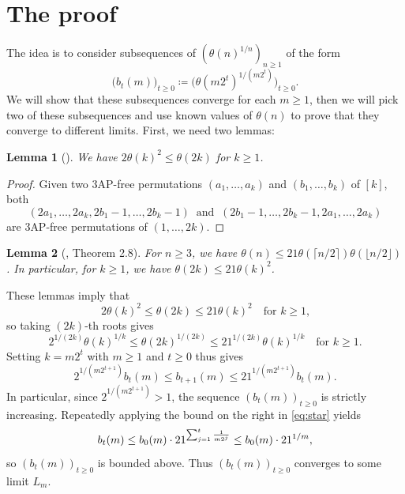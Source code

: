 \documentclass[twoside, reqno]{amsart} %
\newtheorem{lemma}{Lemma}
\begin{document}
\section{The proof}
The idea is to consider subsequences of $(\theta(n)^{1/n})_{n\ge1}$
of the form 
\begin{equation}
\bigl(b_t(m)\bigr)_{t\ge0}\coloneqq\bigl(\theta(m2^t)^{1/(m2^t)}\bigr)_{t\ge0}.
\end{equation}
We will show that these subsequences converge for each $m\ge1$, 
then we will pick two of these subsequences and use known values of $\theta(n)$
to prove that they converge to different limits. First, we need two lemmas:

\begin{lemma}[\cite{DEGS77}]
We have $2\theta(k)^2\le\theta(2k)$ for $k\ge1$.
\end{lemma}

\begin{proof}
Given two $3$AP-free permutations $(a_1,\dots, a_k)$ and 
$(b_1,\dots,b_k)$ of $[k]$,
both $$(2a_1,\dots,2a_k,2b_1-1,\dots,2b_k-1)
\;\;\text{and}\;\; 
(2b_1-1, \dots, 2b_k-1, 2a_1, \dots, 2a_k)$$
are $3$AP-free permutations of $(1,\dots,2k)$.
\end{proof}

\begin{lemma}[\cite{Sha09}, Theorem 2.8] \label{lemma:2}
For $n\ge3$, we have $\theta(n)\le21\theta(\lceil n/2\rceil)\theta(\lfloor n/2\rfloor)$. 
In particular, for $k\ge1$, we have $\theta(2k)\le21\theta(k)^2$.
\end{lemma}
These lemmas imply that
\begin{equation}
2\theta(k)^2\le\theta(2k)\le21\theta(k)^2
\quad\text{for $k\ge1$,}
\end{equation}
so taking $(2k)$-th roots gives
\begin{equation}
2^{1/(2k)}\theta(k)^{1/k}
\le\theta(2k)^{1/(2k)}
\le21^{1/(2k)}\theta(k)^{1/k}
\quad\text{for $k\ge1$.}
\end{equation}
Setting $k=m2^t$ with $m\ge1$ and $t\ge0$ thus gives
\begin{equation} \label{eq:star}
2^{1/(m2^{t+1})}b_t(m)\le b_{t+1}(m)\le21^{1/(m2^{t+1})}b_t(m).
\end{equation}
In particular, since $2^{1/(m2^{t+1})}>1$, the sequence $(b_t(m))_{t\ge0}$
is strictly increasing. 
Repeatedly applying the bound on the right in \eqref{eq:star} yields
\begin{equation}
b_t(m)\le b_0(m)\cdot21^{\sum_{j=1}^t{1\over m2^j}}\le b_0(m)\cdot21^{1/m},
\end{equation}
so $(b_t(m))_{t\ge0}$ is bounded above. Thus $(b_t(m))_{t\ge0}$
converges to some limit $L_m$. 
\end{document}

